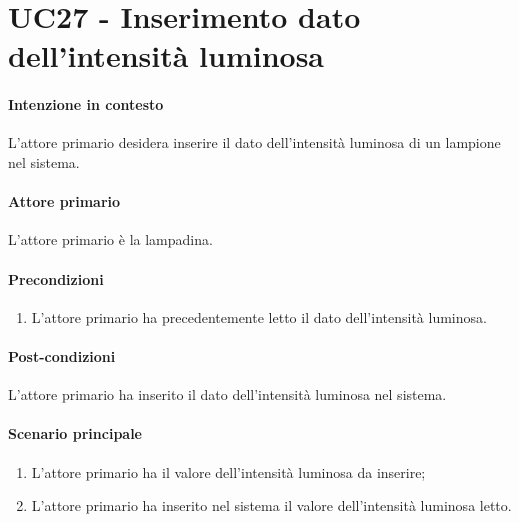 \section{UC27 - Inserimento dato dell'intensità luminosa}\label{uc:27}
\paragraph{Intenzione in contesto} L'attore primario desidera inserire il dato dell'intensità luminosa di un lampione nel sistema.
\paragraph{Attore primario} L'attore primario è la lampadina.
\paragraph{Precondizioni}  
\begin{enumerate}
    \item L'attore primario ha precedentemente letto il dato dell'intensità luminosa.
\end{enumerate}
\paragraph{Post-condizioni} L'attore primario ha inserito il dato dell'intensità luminosa nel sistema.
\paragraph{Scenario principale}
\begin{enumerate}
    \item L'attore primario ha il valore dell'intensità luminosa da inserire;
    \item L'attore primario ha inserito nel sistema il valore dell'intensità luminosa letto.
\end{enumerate}
